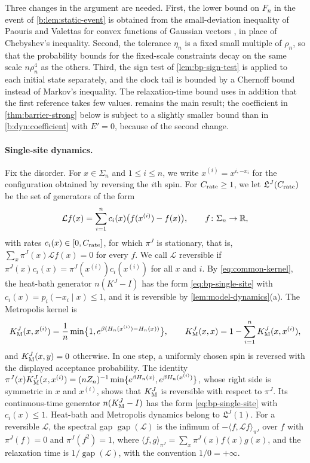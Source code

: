 Three changes in the argument are needed. First, the lower bound on $F_n$ in the event of \cref{b:lem:static-event} is obtained from the small-deviation inequality of Paouris and Valettas for convex functions of Gaussian vectors \cite[Theorem~2.1 and Remark~2.4(3)]{paouris-valettas-2018}, in place of Chebyshev's inequality. Second, the tolerance $\eta_n$ is a fixed small multiple of $\rho_n$, so that the probability bounds for the fixed-scale constraints decay on the same scale $n\rho_n^4$ as the others. Third, the sign test of \cref{lem:bp-sign-test} is applied to each initial state separately, and the clock tail is bounded by a Chernoff bound instead of Markov's inequality. The relaxation-time bound uses in addition that the first reference takes few values.  remains the main result; the coefficient in \cref{thm:barrier-strong} below is subject to a slightly smaller bound than in \eqref{b:dyn:coefficient} with $E'=0$, because of the second change.

\paragraph{Single-site dynamics.} Fix the disorder. For $x\in\Sigma_n$ and $1\le i\le n$, we write $x^{(i)}=x^{i,-x_i}$ for the configuration obtained by reversing the $i$th spin. For $C_{\rm rate}\ge1$, we let $\mathfrak L^J(C_{\rm rate})$ be the set of generators of the form
\begin{equation}\label{eq:bp-single-site}
 \mathcal Lf(x)=\sum_{i=1}^nc_i(x)\bigl(f(x^{(i)})-f(x)\bigr),\qquad f\colon\Sigma_n\to\mathbb R,
\end{equation}
with rates $c_i(x)\in[0,C_{\rm rate}]$, for which $\pi^J$ is stationary, that is, $\sum_x\pi^J(x)\mathcal Lf(x)=0$ for every $f$. We call $\mathcal L$ reversible if $\pi^J(x)c_i(x)=\pi^J(x^{(i)})c_i(x^{(i)})$ for all $x$ and $i$. By \eqref{eq:common-kernel}, the heat-bath generator $n(K^J-I)$ has the form \eqref{eq:bp-single-site} with $c_i(x)=p_i(-x_i\mid x)\le1$, and it is reversible by \cref{lem:model-dynamics}(a). The Metropolis kernel is
\[
 K_{\rm M}^J(x,x^{(i)})=\frac1n\min\bigl\{1,e^{\beta(H_n(x^{(i)})-H_n(x))}\bigr\},\qquad
 K_{\rm M}^J(x,x)=1-\sum_{i=1}^nK_{\rm M}^J(x,x^{(i)}),
\]
and $K_{\rm M}^J(x,y)=0$ otherwise. In one step, a uniformly chosen spin is reversed with the displayed acceptance probability. The identity $\pi^J(x)K^J_{\rm M}(x,x^{(i)})=(nZ_n)^{-1}\min\{e^{\beta H_n(x)},e^{\beta H_n(x^{(i)})}\}$, whose right side is symmetric in $x$ and $x^{(i)}$, shows that $K^J_{\rm M}$ is reversible with respect to $\pi^J$. Its continuous-time generator $n(K^J_{\rm M}-I)$ has the form \eqref{eq:bp-single-site} with $c_i(x)\le1$. Heat-bath and Metropolis dynamics belong to $\mathfrak L^J(1)$. For a reversible $\mathcal L$, the spectral gap $\operatorname{gap}(\mathcal L)$ is the infimum of $-\langle f,\mathcal Lf\rangle_{\pi^J}$ over $f$ with $\pi^J(f)=0$ and $\pi^J(f^2)=1$, where $\langle f,g\rangle_{\pi^J}=\sum_x\pi^J(x)f(x)g(x)$, and the relaxation time is $1/\operatorname{gap}(\mathcal L)$, with the convention $1/0=+\infty$.

